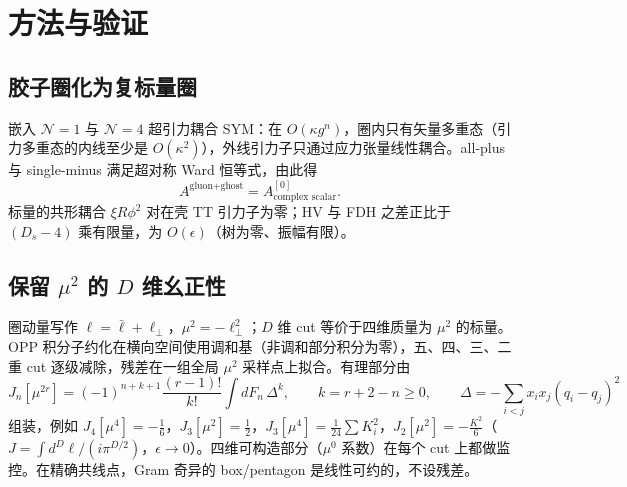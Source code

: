 \documentclass[11pt,a4paper]{ctexart}
\theoremstyle{definition}
\theoremstyle{remark}
\begin{document}
\section{方法与验证}
\subsection{胶子圈化为复标量圈}\label{sec:susy}
嵌入 $\mathcal N=1$ 与 $\mathcal N=4$ 超引力耦合 SYM：在 $O(\kappa g^n)$，圈内只有矢量多重态（引力多重态的内线至少是 $O(\kappa^2)$），外线引力子只通过应力张量线性耦合。all-plus 与 single-minus 满足超对称 Ward 恒等式，由此得
\[
A^{\text{gluon+ghost}}=A^{[0]}_{\text{complex scalar}}.
\]
标量的共形耦合 $\xi R\phi^2$ 对在壳 TT 引力子为零；HV 与 FDH 之差正比于 $(D_s-4)$ 乘有限量，为 $O(\epsilon)$（树为零、振幅有限）。

\subsection{\texorpdfstring{保留 $\mu^2$ 的 $D$ 维幺正性}{保留 mu² 的 D 维幺正性}}
圈动量写作 $\ell=\bar\ell+\ell_\perp$，$\mu^2=-\ell_\perp^2$；$D$ 维 cut 等价于四维质量为 $\mu^2$ 的标量。OPP 积分子约化在横向空间使用调和基（非调和部分积分为零），五、四、三、二重 cut 逐级减除，残差在一组全局 $\mu^2$ 采样点上拟合。有理部分由
\begin{equation}\label{eq:Jmu}
J_n[\mu^{2r}]=(-1)^{n+k+1}\frac{(r-1)!}{k!}\int\! dF_n\,\Delta^k,\qquad k=r+2-n\ge0,\qquad
\Delta=-\sum_{i<j}x_ix_j(q_i-q_j)^2
\end{equation}
组装，例如 $J_4[\mu^4]=-\tfrac16$，$J_3[\mu^2]=\tfrac12$，$J_3[\mu^4]=\tfrac1{24}\sum K_i^2$，$J_2[\mu^2]=-\tfrac{K^2}{6}$（$J=\int d^D\ell/(i\pi^{D/2})$，$\epsilon\to0$）。四维可构造部分（$\mu^0$ 系数）在每个 cut 上都做监控。在精确共线点，Gram 奇异的 box/pentagon 是线性可约的，不设残差。
\end{document}
